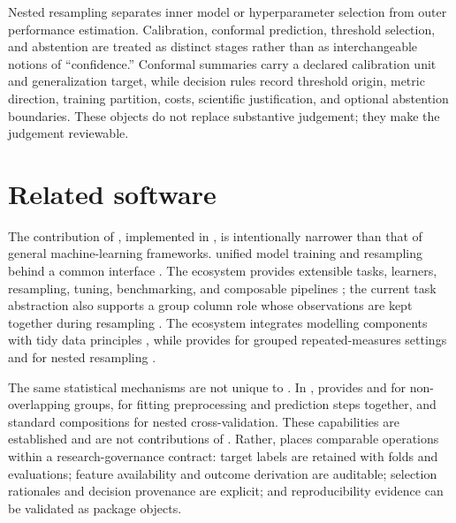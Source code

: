 \documentclass[article]{jss}
\begin{document}
Nested resampling separates inner model or hyperparameter selection from outer
performance estimation. Calibration, conformal prediction, threshold selection, and
abstention are treated as distinct stages rather than as interchangeable notions of
``confidence.'' Conformal summaries carry a declared calibration unit and
generalization target, while decision rules record threshold origin, metric direction,
training partition, costs, scientific justification, and optional abstention
boundaries. These objects do not replace substantive judgement; they make the judgement
reviewable.

\section{Related software}
\label{sec:related}

The contribution of , implemented in  \citep{R2026}, is
intentionally narrower than that of general machine-learning frameworks. 
unified model training and resampling behind
a common interface \citep{Kuhn2008}. The  ecosystem provides extensible
tasks, learners, resampling, tuning, benchmarking, and composable pipelines
\citep{Lang2019,Binder2021}; the current  task abstraction also supports
a group column role whose observations are kept together during resampling
\citep{mlr3Docs2026}. The  ecosystem integrates modelling components with tidy
data principles \citep{KuhnSilge2022}, while  provides
 for grouped repeated-measures settings and 
for nested resampling \citep{rsample2026}.

The same statistical mechanisms are not unique to . In
,  \citep{Pedregosa2011,scikitLearnDocs2026}
provides  and  for non-overlapping groups,
 for fitting preprocessing and prediction steps together, and standard
compositions for nested cross-validation. These capabilities are established and are not
contributions of . Rather,  places comparable operations within a
research-governance contract: target labels are retained
with folds and evaluations; feature availability and outcome derivation are auditable;
selection rationales and decision provenance are explicit; and reproducibility evidence
can be validated as package objects.
\end{document}
